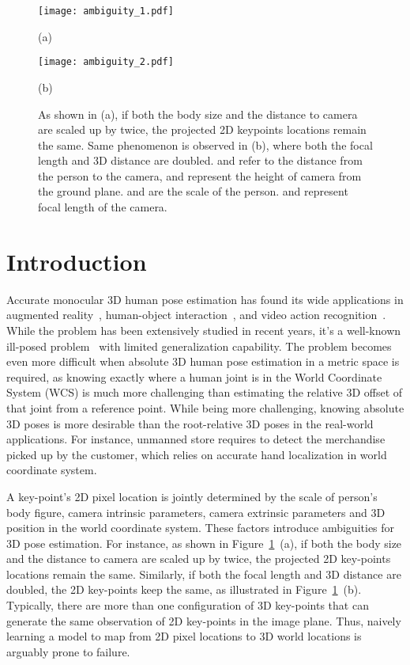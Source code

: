 \documentclass[10pt,twocolumn,letterpaper]{article}
\begin{document}
\begin{figure}[htbp]
	\centering
	\texttt{[image: ambiguity\_1.pdf]}
	\begin{flushleft}
	    \vskip-12pt
		{\footnotesize \hskip100pt (a) } 
	\end{flushleft}
	\vskip-10pt
	\texttt{[image: ambiguity\_2.pdf]}
	\begin{flushleft}
	    \vskip-12pt
		{\footnotesize  \hskip100pt (b) }
	\end{flushleft}
	\vskip-17pt
	\caption{As shown in (a), if both the body size and the distance to camera are scaled up by twice, the projected 2D keypoints locations remain the same. Same phenomenon is observed in (b), where both the focal length and 3D distance are doubled.  and  refer to the distance from the person to the camera,  and  represent the height of camera from the ground plane.  and  are the scale of the person.  and  represent focal length of the camera.} 
	\label{fig:ambiguity}
    \vspace{-6mm}
\end{figure}


\section{Introduction}
\label{sec:intro}
Accurate monocular 3D human pose estimation has found its wide applications in augmented reality~\cite{lin2010augmented}, human-object interaction~\cite{chen2019holistic}, and video action recognition~\cite{sijie2018spatial}. While the problem has been extensively studied in recent years, it's a well-known ill-posed problem~\cite{chen1985determination} with limited generalization capability. The problem becomes even more difficult when absolute 3D human pose estimation in a metric space is required, as knowing exactly where a human joint is in the World Coordinate System (WCS) is much more challenging than estimating the relative 3D offset of that joint from a reference point. While being more challenging, knowing absolute 3D poses is more desirable than the root-relative 3D poses in the real-world applications. For instance, unmanned store requires to detect the merchandise picked up by the customer, which relies on accurate hand localization in world coordinate system. 

A key-point's 2D pixel location is jointly determined by the scale of person's body figure, camera intrinsic parameters, camera extrinsic parameters and 3D position in the world coordinate system. These factors introduce ambiguities for 3D pose estimation. For instance, as shown in Figure~\ref{fig:ambiguity}~(a), if both the body size and the distance to camera are scaled up by twice, the projected 2D key-points locations remain the same. Similarly, if both the focal length and 3D distance are doubled, the 2D key-points keep the same, as illustrated in Figure~\ref{fig:ambiguity}~(b).
Typically, there are more than one configuration of 3D key-points that can generate the same observation of 2D key-points in the image plane.
Thus, naively learning a model to map from 2D pixel locations to 3D world locations is arguably prone to failure.  
\end{document}
